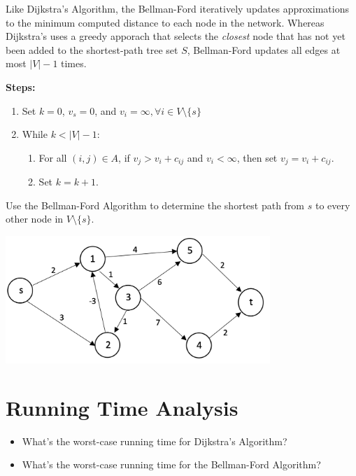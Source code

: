 \documentclass[12pt]{article}
\theoremstyle{definition}
\begin{document}
Like Dijkstra's Algorithm, the Bellman-Ford iteratively updates approximations to the minimum computed distance to each node in the network. Whereas Dijkstra's uses a greedy apporach that selects the \emph{closest} node that has not yet been added to the shortest-path tree set $S$, Bellman-Ford updates all edges at most $|V| - 1$ times. 

\textbf{Steps:}

\begin{enumerate}

\item Set $k = 0$, $v_s = 0$, and $v_i = \infty, \forall i \in V \setminus \{s\}$
\item While $k < |V| - 1$:
	\begin{enumerate}
		\item For all $(i,j) \in A$, if $v_j > v_i + c_{ij}$ and $v_i < \infty$, then set $v_j = v_i + c_{ij}$. 
		\item Set $k = k + 1$. 
	\end{enumerate}
\end{enumerate}

 \newpage
Use the Bellman-Ford Algorithm to determine the shortest path from $s$ to every other node in $V \setminus \{s\}$.

\begin{center}
\includegraphics[width=10cm]{shortestpathnegativecycles}
\end{center}

\vfill


\newpage

\section{Running Time Analysis}

\begin{itemize}

\item What's the worst-case running time for Dijkstra's Algorithm?

\vfill

\item What's the worst-case running time for the Bellman-Ford Algorithm?

\vfill
\end{itemize}
\end{document}

